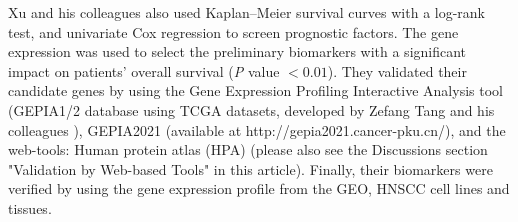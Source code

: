 \documentclass[jpm,article,submit,moreauthors,pdftex]{Definitions/mdpi}
\newenvironment{MyColorPar}[1]{%
    \leavevmode\color{#1}\ignorespaces%
}{%
}%
\begin{document}
\begin{MyColorPar}{red}
Xu and his colleagues\cite{Xu2021a} also used Kaplan–Meier survival curves with a log-rank test, and univariate Cox regression to screen prognostic factors.
The gene expression was used to select the preliminary biomarkers with a significant impact on patients' overall survival (\textit{P} value $< 0.01$).
They validated their candidate genes by using the Gene Expression Profiling Interactive Analysis tool (GEPIA1/2 database using TCGA datasets, developed by Zefang Tang and his colleagues\cite{Tang2017a}\cite{Tang2019}
), GEPIA2021\cite{Li2021} (available at http://gepia2021.cancer-pku.cn/), and the web-tools: Human protein atlas (HPA)\cite{Uhlen2017} (please also see the Discussions section "Validation by Web-based Tools" in this article).
Finally, their biomarkers were verified by using the gene expression profile from the GEO, HNSCC cell lines and tissues.\\
\end{MyColorPar} %

\end{document}
